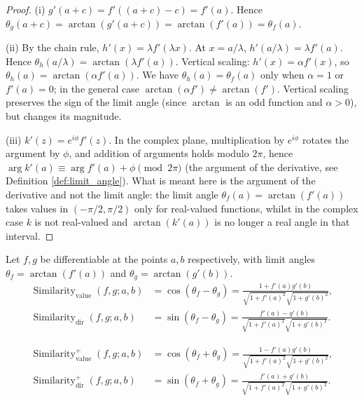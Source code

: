 \begin{proof}
(i) $g'(a+c) = f'((a+c)-c) = f'(a)$. Hence $\theta_g(a+c) = \arctan(g'(a+c)) = \arctan(f'(a)) = \theta_f(a)$.

(ii) By the chain rule, $h'(x) = \lambda f'(\lambda x)$. At $x = a/\lambda$, $h'(a/\lambda) = \lambda f'(a)$. Hence $\theta_h(a/\lambda) = \arctan(\lambda f'(a))$. Vertical scaling: $h'(x) = \alpha f'(x)$, so $\theta_h(a) = \arctan(\alpha f'(a))$. We have $\theta_h(a) = \theta_f(a)$ only when $\alpha = 1$ or $f'(a) = 0$; in the general case $\arctan(\alpha f') \neq \arctan(f')$. Vertical scaling preserves the sign of the limit angle (since $\arctan$ is an odd function and $\alpha > 0$), but changes its magnitude.

(iii) $k'(z) = e^{i\phi} f'(z)$. In the complex plane, multiplication by $e^{i\phi}$ rotates the argument by $\phi$, and addition of arguments holds modulo $2\pi$, hence $\arg k'(a) \equiv \arg f'(a) + \phi \pmod{2\pi}$ (the argument of the derivative, see Definition \ref{def:limit_angle}). What is meant here is the argument of the derivative and not the limit angle: the limit angle $\theta_f(a) = \arctan(f'(a))$ takes values in $(-\pi/2, \pi/2)$ only for real-valued functions, whilst in the complex case $k$ is not real-valued and $\arctan(k'(a))$ is no longer a real angle in that interval.
\end{proof}

\begin{definition}\label{def:diff_similarity}
Let $f, g$ be differentiable at the points $a, b$ respectively, with limit angles $\theta_f = \arctan(f'(a))$ and $\theta_g = \arctan(g'(b))$.
\begin{align*}
\operatorname{Similarity}_{\text{value}}(f, g; a, b) &= \cos(\theta_f - \theta_g) = \frac{1 + f'(a)g'(b)}{\sqrt{1 + f'(a)^2} \sqrt{1 + g'(b)^2}}, \\
\operatorname{Similarity}_{\text{dir}}(f, g; a, b) &= \sin(\theta_f - \theta_g) = \frac{f'(a) - g'(b)}{\sqrt{1 + f'(a)^2} \sqrt{1 + g'(b)^2}}.
\end{align*}
\end{definition}

\begin{definition}\label{def:diff_sum_similarity}
\begin{align*}
\operatorname{Similarity}_{\text{value}}^+(f, g; a, b) &= \cos(\theta_f + \theta_g) = \frac{1 - f'(a)g'(b)}{\sqrt{1 + f'(a)^2} \sqrt{1 + g'(b)^2}}, \\
\operatorname{Similarity}_{\text{dir}}^+(f, g; a, b) &= \sin(\theta_f + \theta_g) = \frac{f'(a) + g'(b)}{\sqrt{1 + f'(a)^2} \sqrt{1 + g'(b)^2}}.
\end{align*}
\end{definition}

